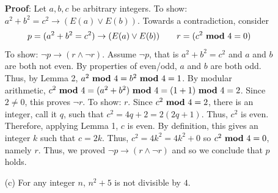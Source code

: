 \documentclass[12pt, oneside]{article}
\begin{document}
\begin{description}
\begin{enumerate}
{  
  {\bf Proof}: Let $a,b,c$ be arbitrary integers.  To show: $a^2 +  b^2 = c^2  \to (E(a) \vee E(b) )$.
  Towards a contradiction, consider
  \[
  p  =   ( a^2 +  b^2 = c^2)  \to (E(a) \vee E(b) ) \qquad  r= (c^2~\text{\bf mod}~4 = 0)
  \]
  To show:  $\neg p \to  (r \land \neg r)$.  Assume $\neg p$, that is 
  $a^2 + b^2 =c^2$ and $a$ and $b$ are both not even.  
  By properties of even/odd, $a$ and $b$ are both odd.  Thus, by Lemma 2,
  $a^2~\text{\bf mod}~4 = b^2 ~\text{\bf mod}~4 = 1$.  By modular arithmetic,
  $c^2 ~\text{\bf mod}~4 = (a^2  + b^2)~\text{\bf mod}~4 = (1 + 1) ~\text{\bf mod}~4 = 2$.
  Since $2 \neq 0$,  this proves $\neg r$.  To show:  $r$.
  Since $c^2~\text{\bf mod}~4 =  2$, there is an integer, call it $q$, such that $c^2 = 4q + 2 = 2(2q+1)$. Thus,
  $c^2$ is even.  Therefore, applying Lemma 1, $c$ is even.
  By definition, this gives an integer $k$ such that $c = 2k$.  Thus, $c^2 = 4k^2 = 4k^2  +0$
  so $c^2~\text{\bf mod}~4 = 0$, namely $r$. Thus, we proved $\neg p \to  (r \land  \neg r)$  and so 
  we conclude that $p$ holds.
  }
  \else{}
  \fi
  
  \item[(c)] For any integer $n$, $n^2 + 5$ is not divisible by $4$.
  

\end{enumerate}
\end{description}
\end{document}
